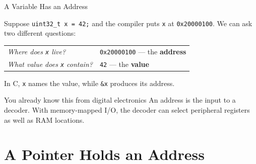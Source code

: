 \documentclass[9pt,aspectratio=169,xcolor=table]{beamer}
\begin{document}
\begin{frame}{A Variable Has an Address}
	\leavevmode

	Suppose \texttt{uint32\_t x = 42;} and the compiler puts \texttt{x} at
	\texttt{0x20000100}. We can ask two different questions:

	\vspace{3mm}
	\begin{center}
		{\small
			\begin{tabular}{@{}ll@{}}
				\emph{Where does \texttt{x} live?}
				& \texttt{0x20000100} --- the \textbf{address} \\[1mm]
				\emph{What value does \texttt{x} contain?}
				& \texttt{42} --- the \textbf{value}
		\end{tabular}}
	\end{center}

	\vspace{3mm}
	{
		In C, \texttt{x} names the value, while \texttt{\&x} produces its
		address.
	}
    \vspace{3mm}
	\begin{block}{You already know this from digital electronics}
		An address is the input to a
		\alert{decoder}. With memory-mapped I/O, the decoder can select
		peripheral registers as well as RAM locations.
	\end{block}

\end{frame}


\section{A Pointer Holds an Address}
\end{document}
